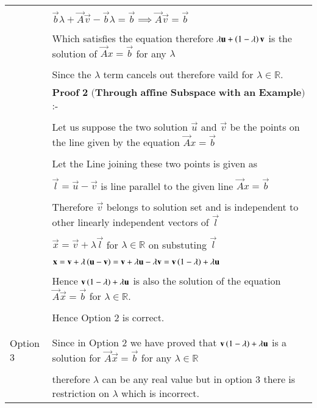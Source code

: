 \documentclass[journal,12pt]{IEEEtran}
\begin{document}
\begin{longtable}{|l|l|}
&\\
&$\vec{b}\lambda + \vec{A}\vec{v} -\vec{b}\lambda=\vec{b}\implies\vec{A}\vec{v}=\vec{b}$\\
&\\
&Which satisfies the equation therefore $\lambda \mathbf{u}  +\left(1-\lambda\right)\mathbf{v}$ is the solution of $\vec{A}x=\vec{b}$ for any $\lambda$\\
&\\
&Since the $\lambda$ term cancels out therefore vaild for $\lambda\in\mathbb{R}$.\\
&\\
&$\textbf{Proof 2 (Through affine Subspace with an Example)}$:-\\
&\\
&Let us suppose the two solution $\vec{u}$ and $\vec{v}$ be the points on the line given by the equation $\vec{A}x=\vec{b}$\\
&\\
&Let the Line joining these two points is given as\\
&\\
&$\vec{l}=\vec{u}-\vec{v}$ is line parallel to the given line $\vec{A}x=\vec{b}$\\
&\\
&Therefore $\vec{v}$ belongs to solution set and is independent to other linearly independent vectors of $\vec{l}$\\
&\\
&$\vec{x}=\vec{v}+\lambda\vec{l}$ for $\lambda\in\mathbb{R}$ on substuting $\vec{l}$\\
&\\
&$\mathbf{x}=\mathbf{v}+\lambda\left(\mathbf{u}-\mathbf{v}\right)=\mathbf{v}+\lambda\mathbf{u}-\lambda\mathbf{v}=\mathbf{v}\left(1-\lambda\right)+\lambda\mathbf{u}$\\
&\\
&Hence $\mathbf{v}\left(1-\lambda\right)+\lambda\mathbf{u}$ is also the solution of the equation $\vec{A}\vec{x}=\vec{b}$ for $\lambda\in\mathbb{R}$.\\
&\\
&Hence Option 2 is correct.\\
&\\
\hline
&\\
Option 3 &Since in Option 2 we have proved that $\mathbf{v}\left(1-\lambda\right)+\lambda\mathbf{u}$  is a solution for $\vec{A}\vec{x}=\vec{b}$  for any $\lambda\in\mathbb{R}$\\
&\\
&therefore $\lambda$ can be any real value but in option 3 there is restriction on $\lambda$ which is incorrect.\\

\end{longtable}
\end{document}
